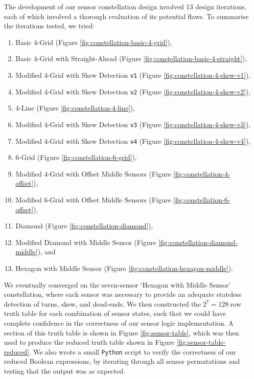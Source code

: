 \documentclass[conference]{IEEEtran}
\begin{document}
The development of our sensor constellation design involved 13 design iterations, each of which involved a thorough evaluation of its potential flaws.
To summarise the iterations tested, we tried:
\begin{enumerate}
	\item Basic 4-Grid (Figure \ref{fig:constellation-basic-4-grid}),
	\item Basic 4-Grid with Straight-Ahead (Figure \ref{fig:constellation-basic-4-straight}),
	\item Modified 4-Grid with Skew Detection \texttt{v1} (Figure \ref{fig:constellation-4-skew-v1}),
	\item Modified 4-Grid with Skew Detection \texttt{v2} (Figure \ref{fig:constellation-4-skew-v2}),
	\item 4-Line (Figure \ref{fig:constellation-4-line}),
	\item Modified 4-Grid with Skew Detection \texttt{v3} (Figure \ref{fig:constellation-4-skew-v3}),
	\item Modified 4-Grid with Skew Detection \texttt{v4} (Figure \ref{fig:constellation-4-skew-v4}),
	\item 6-Grid (Figure \ref{fig:constellation-6-grid}),
	\item Modified 4-Grid with Offset Middle Sensors (Figure \ref{fig:constellation-4-offset}),
	\item Modified 6-Grid with Offset Middle Sensors (Figure \ref{fig:constellation-6-offset}),
	\item Diamond (Figure \ref{fig:constellation-diamond}),
	\item Modified Diamond with Middle Sensor (Figure \ref{fig:constellation-diamond-middle}), and
	\item Hexagon with Middle Sensor (Figure \ref{fig:constellation-hexagon-middle}).
\end{enumerate}

We eventually converged on the seven-sensor `Hexagon with Middle Sensor' constellation, where each sensor was necessary to provide an adequate stateless detection of turns, skew, and dead-ends.
We then constructed the $2^7=\qty{128}{\text{row}}$ truth table for each combination of sensor states, such that we could have complete confidence in the correctness of our sensor logic implementation.
A section of this truth table is shown in Figure \ref{fig:sensor-table}, which was then used to produce the reduced truth table shown in Figure \ref{fig:sensor-table-reduced}.
We also wrote a small \texttt{Python} script to verify the correctness of our reduced Boolean expressions, by iterating through all sensor permutations and testing that the output was as expected.
\end{document}
